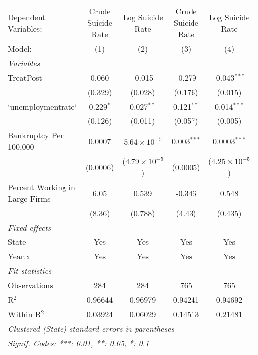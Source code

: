 \begingroup
\centering
\begin{tabular}{lcccc}
   \tabularnewline \midrule \midrule
   Dependent Variables:           & Crude Suicide Rate & Log Suicide Rate        & Crude Suicide Rate & Log Suicide Rate\\  
   Model:                         & (1)                & (2)                     & (3)                & (4)\\  
   \midrule
   \emph{Variables}\\
   TreatPost                      & 0.060              & -0.015                  & -0.279             & -0.043$^{***}$\\   
                                  & (0.329)            & (0.028)                 & (0.176)            & (0.015)\\   
   `unemploymentrate`             & 0.229$^{*}$        & 0.027$^{**}$            & 0.121$^{**}$       & 0.014$^{***}$\\   
                                  & (0.126)            & (0.011)                 & (0.057)            & (0.005)\\   
   Bankruptcy Per 100,000         & 0.0007             & $5.64\times 10^{-5}$    & 0.003$^{***}$      & 0.0003$^{***}$\\   
                                  & (0.0006)           & ($4.79\times 10^{-5}$)  & (0.0005)           & ($4.25\times 10^{-5}$)\\    
   Percent Working in Large Firms & 6.05               & 0.539                   & -0.346             & 0.548\\   
                                  & (8.36)             & (0.788)                 & (4.43)             & (0.435)\\   
   \midrule
   \emph{Fixed-effects}\\
   State                          & Yes                & Yes                     & Yes                & Yes\\  
   Year.x                         & Yes                & Yes                     & Yes                & Yes\\  
   \midrule
   \emph{Fit statistics}\\
   Observations                   & 284                & 284                     & 765                & 765\\  
   R$^2$                          & 0.96644            & 0.96979                 & 0.94241            & 0.94692\\  
   Within R$^2$                   & 0.03924            & 0.06029                 & 0.14513            & 0.21481\\  
   \midrule \midrule
   \multicolumn{5}{l}{\emph{Clustered (State) standard-errors in parentheses}}\\
   \multicolumn{5}{l}{\emph{Signif. Codes: ***: 0.01, **: 0.05, *: 0.1}}\\
\end{tabular}
\par\endgroup



